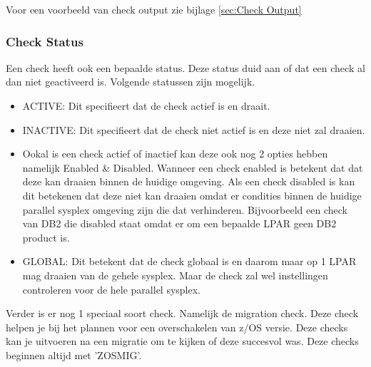 Voor een voorbeeld van check output zie bijlage \ref{sec:Check Output}

\subsubsection{Check Status}
\label{subsubsec:Check Status}

Een check heeft ook een bepaalde status. Deze status duid aan of dat een check al dan niet geactiveerd is. Volgende statussen zijn mogelijk. \cite{IBM2019}

\begin{itemize}
	\item ACTIVE: Dit specifieert dat de check actief is en draait.
	\item INACTIVE: Dit specifieert dat de check niet actief is en deze niet zal draaien.
	\item Ookal is een check actief of inactief kan deze ook nog 2 opties hebben namelijk Enabled \& Disabled. Wanneer een check enabled is betekent dat dat deze kan draaien binnen de huidige omgeving. Als een check disabled is kan dit betekenen dat deze niet kan draaien omdat er condities binnen de huidige parallel sysplex omgeving zijn die dat verhinderen. Bijvoorbeeld een check van DB2 die disabled staat omdat er om een bepaalde LPAR geen DB2 product is.
	\item GLOBAL: Dit betekent dat de check globaal is en daarom maar op 1 LPAR mag draaien van de gehele sysplex. Maar de check zal wel instellingen controleren voor de hele parallel sysplex. 
\end{itemize}


Verder is er nog 1 speciaal soort check. Namelijk de migration check. Deze check helpen je bij het plannen voor een overschakelen van z/OS versie. Deze checks kan je uitvoeren na een migratie om te kijken of deze succesvol was. Deze checks beginnen altijd met 'ZOSMIG'.
